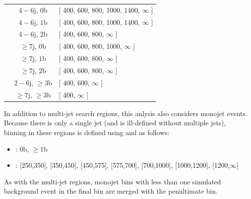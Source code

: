 \begin{table}
\begin{tabular}{ccl}
 & $4-6$j, $  0$b  &  [ 400, 600, 800, 1000, 1400,  $\infty$  ] \\

 & $4-6$j, $  1$b  &  [ 400, 600, 800, 1000, 1400,  $\infty$  ] \\

 & $4-6$j, $  2$b  &  [ 400, 600, 800,  $\infty$  ] \\

 & $\geq7$j, $  0$b  &  [ 400, 600, 800, 1000,  $\infty$  ] \\

 & $\geq7$j, $  1$b  &  [ 400, 600, 800,  $\infty$  ] \\

 & $\geq7$j, $  2$b  &  [ 400, 600, 800,  $\infty$  ] \\

 & $2-6$j, $  \geq3$b  &  [ 400, 600, $\infty$  ] \\

 & $\geq7$j, $  \geq3$b  &  [ 400, $\infty$ ] \\ 

\hline
	\end{tabular}
	\label{tbl:mt2bins2}
\end{table}
In addition to multi-jet search regions, this anlysis also considers monojet events. Because there is only a single jet (and \mttwo is ill-defined without multiple jets), binning in these regions is defined using \nb and \HT as follows:
\begin{itemize}
	\item \nb: 0b, $\geq$1b
	\item \HT: [250,350], [350,450], [450,575], [575,700], [700,1000], [1000,1200], [1200,$\infty$]
\end{itemize}
As with the multi-jet regions, monojet \HT bins with less than one simulated background event in the final bin are merged with the penultimate bin.


